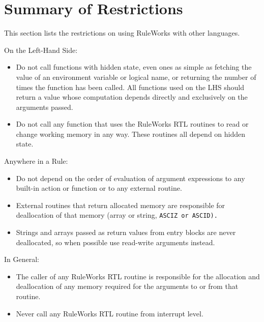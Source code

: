 \section{Summary of Restrictions}

This section lists the restrictions on using RuleWorks with other
languages.

On the Left-Hand Side:

\begin{itemize}
\item Do not call functions with hidden state, even ones as simple as
  fetching the value of an environment variable or logical name, or
  returning the number of times the function has been called. All
  functions used on the LHS should return a value whose computation
  depends directly and exclusively on the arguments passed.
\item Do not call any function that uses the RuleWorks RTL routines to
  read or change working memory in any way. These routines all depend
  on hidden state.
\end{itemize}

Anywhere in a Rule:

\begin{itemize}
\item Do not depend on the order of evaluation of argument expressions
  to any built-in action or function or to any external routine.
\item External routines that return allocated memory are responsible
  for deallocation of that memory (array or string, \tt{ASCIZ} or
  \tt{ASCID}).
\item Strings and arrays passed as return values from entry blocks are
  never deallocated, so when possible use read-write arguments
  instead.
\end{itemize}

In General:

\begin{itemize}             
\item The caller of any RuleWorks RTL routine is responsible for the
  allocation and deallocation of any memory required for the arguments
  to or from that routine.
\item Never call any RuleWorks RTL routine from interrupt level.
\end{itemize}

